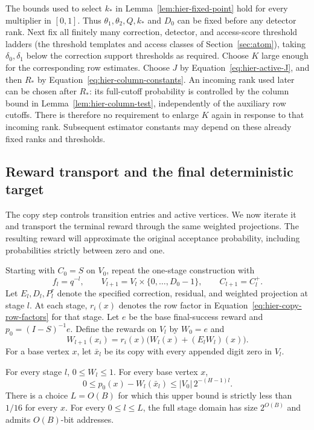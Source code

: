\begin{remark}
\label{rem:hier-constant-order}
The bounds used to select $k_*$ in
Lemma~\ref{lem:hier-fixed-point} hold for every multiplier in $[0,1]$.
Thus $\theta_1,\theta_2,Q,k_*$ and $D_0$ can be fixed before any
detector rank.  Next fix all finitely many correction, detector, and
access-score threshold ladders (the threshold templates and access classes
of Section~\ref{sec:atom}), taking $\delta_0,\delta_1$ below the
correction support thresholds as required.  Choose $K$ large enough for
the corresponding row estimates.  Choose $J$ by
Equation~\eqref{eq:hier-active-J}, and then $R_*$ by
Equation~\eqref{eq:hier-column-constants}.  An incoming rank used later
can be chosen after $R_*$: its full-cutoff probability is controlled by
the column bound in Lemma~\ref{lem:hier-column-test}, independently of
the auxiliary row cutoffs.  There is therefore no requirement to enlarge
$K$ again in response to that incoming rank.  Subsequent estimator
constants may depend on these already fixed ranks and thresholds.
\end{remark}

\subsection{Reward transport and the final deterministic target}

The copy step controls transition entries and active vertices.  We now
iterate it and transport the terminal reward through the same weighted
projections.  The resulting reward will approximate the original
acceptance probability, including probabilities strictly between zero
and one.

Starting with $C_0=S$ on $V_0$, repeat the one-stage construction with
\[
 f_l=q^{-l},\qquad
 V_{l+1}=V_l\times\{0,\ldots,D_0-1\},\qquad C_{l+1}=C_l^+.
\]
Let $E_l,D_l,P_l^r$ denote the specified correction, residual, and
weighted projection at stage $l$. At each stage, $r_i(x)$ denotes the
row factor in Equation~\eqref{eq:hier-copy-row-factors} for that stage.
Let $e$ be the base final-success reward and $p_0=(I-S)^{-1}e$.
Define the rewards on $V_l$ by $W_0=e$ and
\begin{equation}
 W_{l+1}(x_i)=r_i(x)\bigl(W_l(x)+(E_lW_l)(x)\bigr).
 \label{eq:hier-reward-update}
\end{equation}
For a base vertex $x$, let $\bar x_l$ be its copy with every appended digit zero in $V_l$.

\begin{proposition}
\label{prop:hier-reward-target}
For every stage $l$, $0\le W_l\le1$. For every base vertex $x$,
\begin{equation}
 0\leq p_0(x)-W_l(\bar x_l)
       \leq |V_0|\,2^{-(H-1)l}.
 \label{eq:hier-final-error}
\end{equation}
There is a choice $L=O(B)$ for which this upper bound is strictly less
than $1/16$ for every $x$. For every $0\le l\le L$, the full stage
domain has size $2^{O(B)}$ and admits $O(B)$-bit addresses.
\end{proposition}

